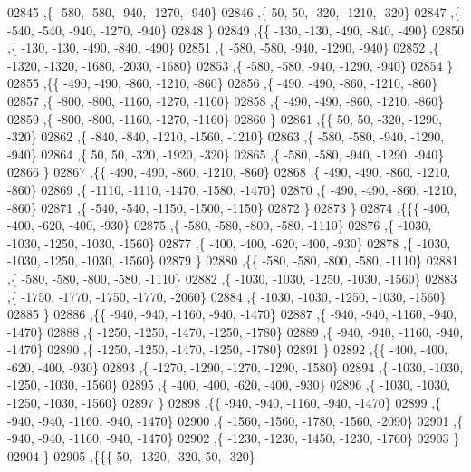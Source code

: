 \begin{DoxyCode}
02845     ,\{  -580,  -580,  -940, -1270,  -940\}
02846     ,\{    50,    50,  -320, -1210,  -320\}
02847     ,\{  -540,  -540,  -940, -1270,  -940\}
02848     \}
02849    ,\{\{  -130,  -130,  -490,  -840,  -490\}
02850     ,\{  -130,  -130,  -490,  -840,  -490\}
02851     ,\{  -580,  -580,  -940, -1290,  -940\}
02852     ,\{ -1320, -1320, -1680, -2030, -1680\}
02853     ,\{  -580,  -580,  -940, -1290,  -940\}
02854     \}
02855    ,\{\{  -490,  -490,  -860, -1210,  -860\}
02856     ,\{  -490,  -490,  -860, -1210,  -860\}
02857     ,\{  -800,  -800, -1160, -1270, -1160\}
02858     ,\{  -490,  -490,  -860, -1210,  -860\}
02859     ,\{  -800,  -800, -1160, -1270, -1160\}
02860     \}
02861    ,\{\{    50,    50,  -320, -1290,  -320\}
02862     ,\{  -840,  -840, -1210, -1560, -1210\}
02863     ,\{  -580,  -580,  -940, -1290,  -940\}
02864     ,\{    50,    50,  -320, -1920,  -320\}
02865     ,\{  -580,  -580,  -940, -1290,  -940\}
02866     \}
02867    ,\{\{  -490,  -490,  -860, -1210,  -860\}
02868     ,\{  -490,  -490,  -860, -1210,  -860\}
02869     ,\{ -1110, -1110, -1470, -1580, -1470\}
02870     ,\{  -490,  -490,  -860, -1210,  -860\}
02871     ,\{  -540,  -540, -1150, -1500, -1150\}
02872     \}
02873    \}
02874   ,\{\{\{  -400,  -400,  -620,  -400,  -930\}
02875     ,\{  -580,  -580,  -800,  -580, -1110\}
02876     ,\{ -1030, -1030, -1250, -1030, -1560\}
02877     ,\{  -400,  -400,  -620,  -400,  -930\}
02878     ,\{ -1030, -1030, -1250, -1030, -1560\}
02879     \}
02880    ,\{\{  -580,  -580,  -800,  -580, -1110\}
02881     ,\{  -580,  -580,  -800,  -580, -1110\}
02882     ,\{ -1030, -1030, -1250, -1030, -1560\}
02883     ,\{ -1750, -1770, -1750, -1770, -2060\}
02884     ,\{ -1030, -1030, -1250, -1030, -1560\}
02885     \}
02886    ,\{\{  -940,  -940, -1160,  -940, -1470\}
02887     ,\{  -940,  -940, -1160,  -940, -1470\}
02888     ,\{ -1250, -1250, -1470, -1250, -1780\}
02889     ,\{  -940,  -940, -1160,  -940, -1470\}
02890     ,\{ -1250, -1250, -1470, -1250, -1780\}
02891     \}
02892    ,\{\{  -400,  -400,  -620,  -400,  -930\}
02893     ,\{ -1270, -1290, -1270, -1290, -1580\}
02894     ,\{ -1030, -1030, -1250, -1030, -1560\}
02895     ,\{  -400,  -400,  -620,  -400,  -930\}
02896     ,\{ -1030, -1030, -1250, -1030, -1560\}
02897     \}
02898    ,\{\{  -940,  -940, -1160,  -940, -1470\}
02899     ,\{  -940,  -940, -1160,  -940, -1470\}
02900     ,\{ -1560, -1560, -1780, -1560, -2090\}
02901     ,\{  -940,  -940, -1160,  -940, -1470\}
02902     ,\{ -1230, -1230, -1450, -1230, -1760\}
02903     \}
02904    \}
02905   ,\{\{\{    50, -1320,  -320,    50,  -320\}

\end{DoxyCode}
